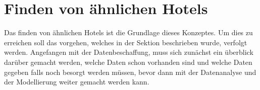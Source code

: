 \section{Finden von ähnlichen Hotels}
\label{sec:find_similar}
Das finden von ähnlichen Hotels ist die Grundlage dieses Konzeptes. Um dies zu erreichen soll das vorgehen, welches in der Sektion \emph{} beschrieben wurde, verfolgt werden. Angefangen mit der Datenbeschaffung, muss sich zunächst ein überblick darüber gemacht werden, welche Daten schon vorhanden sind und welche Daten gegeben falls noch besorgt werden müssen, bevor dann mit der Datenanalyse und der Modellierung weiter gemacht werden kann. 







